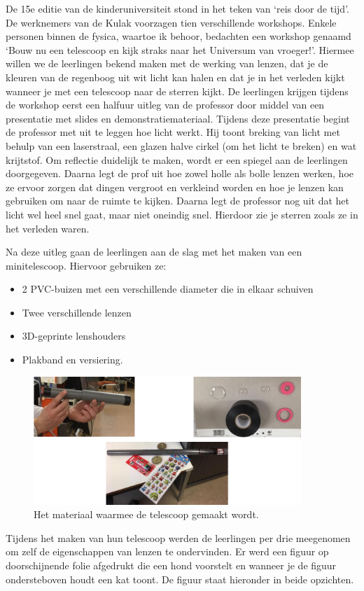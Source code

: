 \documentclass[a4paper,12pt,twoside]{article}%
\begin{document}
De 15e editie van de kinderuniversiteit stond in het teken van `reis door de tijd'. De werknemers van de Kulak voorzagen tien verschillende workshops. Enkele personen binnen de fysica, waartoe ik behoor, bedachten een workshop genaamd `Bouw nu een telescoop en kijk straks naar het Universum van vroeger!'. Hiermee willen we de leerlingen bekend maken met de werking van lenzen, dat je de kleuren van de regenboog uit wit licht kan halen en dat je in het verleden kijkt wanneer je met een telescoop naar de sterren kijkt. De leerlingen krijgen tijdens de workshop eerst een halfuur uitleg van de professor door middel van een presentatie met slides en demonstratiemateriaal. Tijdens deze presentatie begint de professor met uit te leggen hoe licht werkt. Hij toont breking van licht met behulp van een laserstraal, een glazen halve cirkel (om het licht te breken) en wat krijtstof. Om reflectie duidelijk te maken, wordt er een spiegel aan de leerlingen doorgegeven. Daarna legt de prof uit hoe zowel holle als bolle lenzen werken, hoe ze ervoor zorgen dat dingen vergroot en verkleind worden en hoe je lenzen kan gebruiken om naar de ruimte te kijken. Daarna legt de professor nog uit dat het licht wel heel snel gaat, maar niet oneindig snel. Hierdoor zie je sterren zoals ze in het verleden waren. \newline\newline

Na deze uitleg gaan de leerlingen aan de slag met het maken van een minitelescoop. Hiervoor gebruiken ze:
\begin{itemize}
	\item 2 PVC-buizen met een verschillende diameter die in elkaar schuiven
	\item Twee verschillende lenzen
	\item 3D-geprinte lenshouders
	\item Plakband en versiering.
\end{itemize}
\begin{figure}[!h]
	\centering
	\includegraphics[width=0.9\textwidth]{Telescoop}
	\caption{Het materiaal waarmee de telescoop gemaakt wordt.}
	\label{Fig::Telescoop}
\end{figure}
Tijdens het maken van hun telescoop werden de leerlingen per drie meegenomen om zelf de eigenschappen van lenzen te ondervinden. Er werd een figuur op doorschijnende folie afgedrukt die een hond voorstelt en wanneer je de figuur ondersteboven houdt een kat toont. De figuur staat hieronder in beide opzichten.
\end{document}
